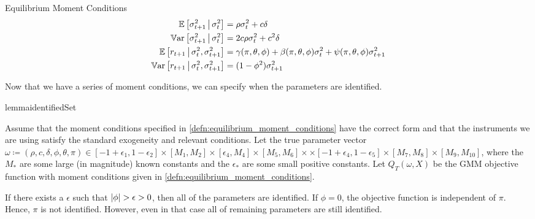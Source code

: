 \documentclass[11pt, letterpaper, twoside]{article}
\begin{document}
\begin{defn}{Equilibrium Moment Conditions}
    \label{defn:equilibrium_moment_conditions}
    \begin{align}
        \label{eqn:cond_vol_mean}
        \E\left[\sigma^2_{t+1} \mvert \sigma^2_t \right] &= \rho \sigma^2_t + c \delta\\
%    
        \label{eqn:cond_vol_var}
        \Var\left[\sigma^2_{t+1} \mvert \sigma^2_t \right] &= 2 c \rho \sigma^2_t + c^2 \delta \\
%        
        \label{eqn:cond_expected_rtn_moment}
        \E\left[r_{t+1} \mvert \sigma^2_t, \sigma^2_{t+1}\right] &= \gamma(\pi, \theta, \phi) + \beta(\pi, \theta, \phi) \sigma^2_t + \psi(\pi, \theta, \phi) \sigma^2_{t+1} \\
%        
        \label{eqn:cond_rtn_var}
        \Var\left[r_{t+1} \mvert \sigma^2_t, \sigma^2_{t+1}\right] &= (1 - \phi^2) \sigma^2_{t+1} 
    \end{align}
\end{defn}

Now that we have a series of moment conditions, we can specify when the parameters are identified.

\begin{restatable}{lemma}{identifiedSet}

    Assume that the moment conditions specified in \cref{defn:equilibrium_moment_conditions} have the correct form and that the instruments we are using satisfy the standard exogeneity and relevant conditions. Let the true parameter vector $\omega \coloneqq (\rho, c, \delta, \phi, \theta, \pi) \in [-1+\epsilon_1, 1 - \epsilon_2] \times [M_1, M_2] \times [\epsilon_4, M_4]\times [M_5, M_6]\times \times [-1 + \epsilon_4, 1 - \epsilon_5] \times [M_7, M_8] \times [M_{9}, M_{10}]$, where the $M_{\ast}$ are some large (in magnitude) known constants and the $\epsilon_{\ast}$ are some small positive constants. Let $Q_T(\omega, X)$ be the GMM objective function with moment conditions given in \cref{defn:equilibrium_moment_conditions}.  
 
    If there exists a $\epsilon$ such that $\lvert\phi\rvert > \epsilon > 0$, then all of the parameters are identified.  If $\phi = 0$, the objective function is independent of $\pi$.  Hence, $\pi$ is not identified. However, even in that case all of remaining parameters are still identified.

\end{restatable}
\end{document}
